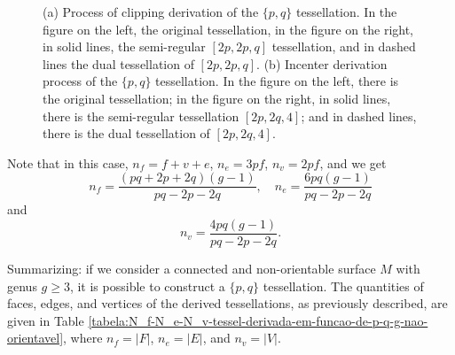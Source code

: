\documentclass[%
reprint,
amsmath,amssymb,
aps,
]{revtex4-2}
\begin{document}
\begin{figure}[H]
		\caption{(a) Process of clipping derivation of the $\{p,q\}$ tessellation. In the figure on the left, the original tessellation, in the figure on the right, in solid lines, the semi-regular $[2p,2p,q]$ tessellation, and in dashed lines the dual tessellation of $[2p,2p,q]$. (b) Incenter derivation process of the $\{p,q\}$ tessellation. In the figure on the left, there is the original tessellation; in the figure on the right, in solid lines, there is the semi-regular tessellation $[2p,2q,4]$; and in dashed lines, there is the dual tessellation of $[2p,2q,4]$.} \label{tesselderivada} 
\end{figure}

Note that in this case, $n_f = f + v + e$, $n_e = 3p f$, $n_v = 2 p f$, and we get 
\[
n_f = \dfrac{(pq+2p+2q)(g-1)}{pq-2p-2q}, \quad  n_e = \dfrac{6pq(g-1)}{pq-2p-2q} 
\]
and  
\[
n_v = \dfrac{4pq(g-1)}{pq-2p-2q}.
\]

Summarizing: if we consider a connected and non-orientable surface $M$ with genus $g\geq 3$, it is possible to construct a $\{p, q\}$ tessellation. The quantities of faces, edges, and vertices of the derived tessellations, as previously described, are given in Table \ref{tabela:N_f-N_e-N_v-tessel-derivada-em-funcao-de-p-q-g-nao-orientavel}, where $n_f = |F|$, $n_e = |E|$, and $n_v = |V|$.
\end{document}
